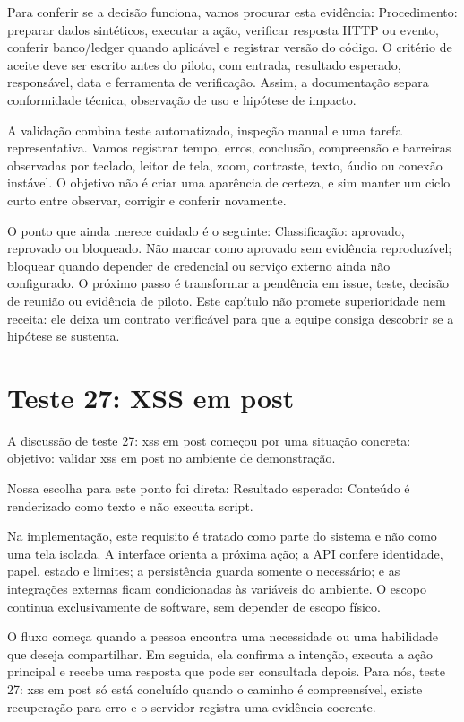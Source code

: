 \documentclass[12pt,oneside,a4paper,article]{abntex2}
\begin{document}
Para conferir se a decisão funciona, vamos procurar esta evidência: Procedimento: preparar dados sintéticos, executar a ação, verificar resposta HTTP ou evento, conferir banco/ledger quando aplicável e registrar versão do código. O critério de aceite deve ser escrito antes do piloto, com entrada, resultado esperado, responsável, data e ferramenta de verificação. Assim, a documentação separa conformidade técnica, observação de uso e hipótese de impacto.

A validação combina teste automatizado, inspeção manual e uma tarefa representativa. Vamos registrar tempo, erros, conclusão, compreensão e barreiras observadas por teclado, leitor de tela, zoom, contraste, texto, áudio ou conexão instável. O objetivo não é criar uma aparência de certeza, e sim manter um ciclo curto entre observar, corrigir e conferir novamente.

O ponto que ainda merece cuidado é o seguinte: Classificação: aprovado, reprovado ou bloqueado. Não marcar como aprovado sem evidência reproduzível; bloquear quando depender de credencial ou serviço externo ainda não configurado. O próximo passo é transformar a pendência em issue, teste, decisão de reunião ou evidência de piloto. Este capítulo não promete superioridade nem receita: ele deixa um contrato verificável para que a equipe consiga descobrir se a hipótese se sustenta.

\section{Teste 27: XSS em post}
A discussão de teste 27: xss em post começou por uma situação concreta: objetivo: validar xss em post no ambiente de demonstração.

Nossa escolha para este ponto foi direta: Resultado esperado: Conteúdo é renderizado como texto e não executa script.

Na implementação, este requisito é tratado como parte do sistema e não como uma tela isolada. A interface orienta a próxima ação; a API confere identidade, papel, estado e limites; a persistência guarda somente o necessário; e as integrações externas ficam condicionadas às variáveis do ambiente. O escopo continua exclusivamente de software, sem depender de escopo físico.

O fluxo começa quando a pessoa encontra uma necessidade ou uma habilidade que deseja compartilhar. Em seguida, ela confirma a intenção, executa a ação principal e recebe uma resposta que pode ser consultada depois. Para nós, teste 27: xss em post só está concluído quando o caminho é compreensível, existe recuperação para erro e o servidor registra uma evidência coerente.
\end{document}
